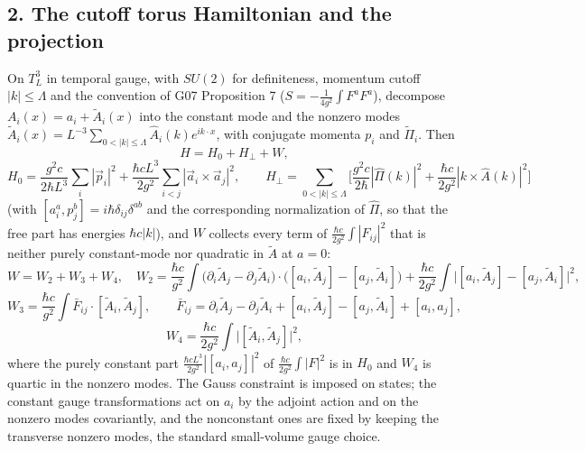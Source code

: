 \documentclass[11pt,a4paper]{article}
\begin{document}
\hypertarget{the-cutoff-torus-hamiltonian-and-the-projection}{%
\subsection{2. The cutoff torus Hamiltonian and the
projection}\label{the-cutoff-torus-hamiltonian-and-the-projection}}

On \(T^3_L\) in temporal gauge, with \(SU(2)\) for definiteness,
momentum cutoff \(|k|\le\Lambda\) and the convention of G07 Proposition
7 (\(S=-\frac1{4g^2}\int F^aF^a\)), decompose
\(A_i(x)=a_i+\tilde A_i(x)\) into the constant mode and the nonzero
modes
\(\tilde A_i(x)=L^{-3}\sum_{0<|k|\le\Lambda}\hat A_i(k)e^{ik\cdot x}\),
with conjugate momenta \(p_i\) and \(\tilde\Pi_i\). Then
\[H=H_0+H_\perp+W,\]
\[H_0=\frac{g^2c}{2\hbar L^3}\sum_i|\vec p_i|^2+\frac{\hbar cL^3}{2g^2}\sum_{i<j}|\vec a_i\times\vec a_j|^2,\qquad H_\perp=\sum_{0<|k|\le\Lambda}\Big[\frac{g^2c}{2\hbar}|\hat\Pi(k)|^2+\frac{\hbar c}{2g^2}|k\times\hat A(k)|^2\Big]\]
(with \([a^a_i,p^b_j]=i\hbar\delta_{ij}\delta^{ab}\) and the
corresponding normalization of \(\hat\Pi\), so that the free part has
energies \(\hbar c|k|\)), and \(W\) collects every term of
\(\frac{\hbar c}{2g^2}\int|F_{ij}|^2\) that is neither purely
constant-mode nor quadratic in \(\tilde A\) at \(a=0\):
\[W=W_2+W_3+W_4,\quad
W_2=\frac{\hbar c}{g^2}\int\big(\partial_i\tilde A_j-\partial_j\tilde A_i\big)\cdot\big([a_i,\tilde A_j]-[a_j,\tilde A_i]\big)+\frac{\hbar c}{2g^2}\int\big|[a_i,\tilde A_j]-[a_j,\tilde A_i]\big|^2,\]
\[W_3=\frac{\hbar c}{g^2}\int\bar F_{ij}\cdot[\tilde A_i,\tilde A_j],\qquad
\bar F_{ij}=\partial_i\tilde A_j-\partial_j\tilde A_i+[a_i,\tilde A_j]-[a_j,\tilde A_i]+[a_i,a_j],\]
\[W_4=\frac{\hbar c}{2g^2}\int\big|[\tilde A_i,\tilde A_j]\big|^2 ,\]
where the purely constant part \(\frac{\hbar cL^3}{2g^2}|[a_i,a_j]|^2\)
of \(\frac{\hbar c}{2g^2}\int|F|^2\) is in \(H_0\) and \(W_4\) is
quartic in the nonzero modes. The Gauss constraint is imposed on states;
the constant gauge transformations act on \(a_i\) by the adjoint action
and on the nonzero modes covariantly, and the nonconstant ones are fixed
by keeping the transverse nonzero modes, the standard small-volume gauge
choice.
\end{document}

